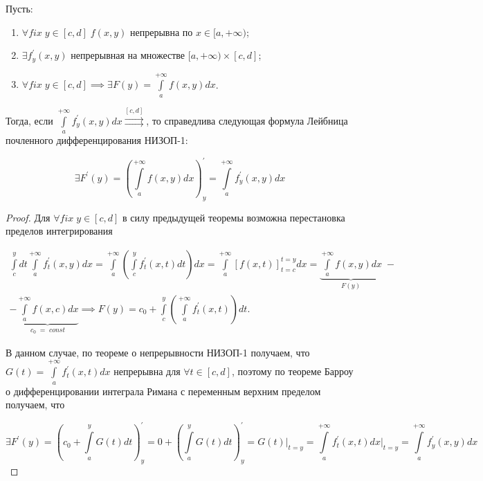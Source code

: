 \documentclass[../../main.tex]{subfiles}
\begin{document}
\begin{thm}
	Пусть: 
	\begin{enumerate}
		\item $\forall fix \; y \in [c, d] \; f(x, y)$ непрерывна по $x \in [a, +\infty)$;
		\item $\exists f^{'}_y (x, y)$ непрерывная на множестве $[a, +\infty) \times [c, d]$;
		\item $\forall fix \; y \in [c, d] \implies \exists F(y) = \int\limits_a^{+\infty} f(x, y) dx$.
	\end{enumerate}
	Тогда, если $\displaystyle \int\limits_a^{+\infty} f^{'}_y (x, y) dx \overset{[c, d]}{\rightrightarrows}$, то справедлива следующая формула Лейбница почленного дифференцирования НИЗОП-1:
	
	\begin{equation} \label{lec11:2}
		\exists F^{'}(y) = \left( \int\limits_a^{+\infty} f(x, y) dx \right)^{'}_y = \int\limits_a^{+\infty} f^{'}_y (x, y) dx 
	\end{equation}
	
	\begin{proof}
		Для $\forall fix \; y \in [c, d]$ в силу предыдущей теоремы возможна перестановка пределов интегрирования
		
		\begin{equation*}
		\begin{gathered}
		\int\limits_c^y dt \int\limits_a^{+\infty} f^{'}_{t}(x, y) dx =
		\int\limits_a^{+\infty} \left( \int\limits_c^y f^{'}_{t} (x, t) dt \right) dx =
		\int\limits_a^{+\infty} \left[ f(x, t) \right]_{t = c}^{t = y} dx
		= \underbrace{\int\limits_a^{+\infty} f(x, y) dx}_{F(y)}\;- \\
		- \underbrace{\int\limits_a^{+\infty} f (x, c) dx}_{c_0\;=\;const} \implies 
		F(y) = c_0 + \int\limits_c^y \left( \int\limits_a^{+\infty} f^{'}_{t} (x, t) \right) dt.
		\end{gathered}
		\end{equation*}
		
		В данном случае, по теореме о непрерывности НИЗОП-1 получаем, что $G(t) = \int\limits_a^{+\infty} f_{t}^{'}(x, t) dx$ непрерывна для $\forall t \in [c, d]$, поэтому по теореме Барроу о дифференцировании интеграла Римана с переменным верхним пределом получаем, что
		
		$$
		\exists F^{'}(y) = (c_0 + \int\limits_a^y G(t)dt)^{'}_y = 0 + (\int\limits_a^y G(t)dt)^{'}_y = G(t)\bigg|_{t = y} = \int\limits_a^{+\infty} f^{'}_t (x, t) dx\bigg|_{t = y} = \int\limits^{+\infty}_a  f^{'}_y (x, y) dx
		$$ 
	\end{proof}
	
\end{thm}
\end{document}
